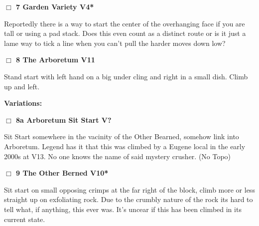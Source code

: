 	\begin{multicols}{2}

\needspace{2em}
\label{rt:Garden Variety}
\colorbox{RoyalBlue!20}{
\parbox{0.95\linewidth}{
\hspace{-1ex}\textbf{$\Box$
7 Garden Variety V4*  
}}}
\begin{adjustwidth}{1.3em}{}			

Reportedly there is a way to start the center of the overhanging face if you are tall or using a pad stack. Does this even count as a distinct route or is it just a lame way to tick a line when you can't pull the harder moves down low?
\end{adjustwidth}




\needspace{2em}
\label{rt:The Arboretum}
\colorbox{red!20}{
\parbox{0.95\linewidth}{
\hspace{-1ex}\textbf{$\Box$
8 The Arboretum V11  
}}}
\begin{adjustwidth}{1.3em}{}			

Stand start with left hand on a big under cling and right in a small dish. Climb up and left.
\end{adjustwidth}


\begin{adjustwidth}{0.5cm}{}				
\needspace{4em}
\textbf{Variations:} \newline

\needspace{2em}
\label{vr:Arboretum Sit Start}
\colorbox{black!20}{
\parbox{0.95\linewidth}{
\hspace{-1ex}\textbf{$\Box$
8a Arboretum Sit Start V?  
}}}
\begin{adjustwidth}{1.3em}{}			

Sit Start somewhere in the vacinity of the Other Bearned, somehow link into Arboretum. Legend has it that this was climbed by a Eugene local in the early 2000s at V13. No one knows the name of said mystery crusher.
  (No Topo)
\end{adjustwidth}



\end{adjustwidth}


\needspace{2em}
\label{rt:The Other Berned}
\colorbox{red!20}{
\parbox{0.95\linewidth}{
\hspace{-1ex}\textbf{$\Box$
9 The Other Berned V10*  
}}}
\begin{adjustwidth}{1.3em}{}			

Sit start on small opposing crimps at the far right of the block, climb more or less straight up on exfoliating rock. Due to the crumbly nature of the rock its hard to tell what, if anything, this ever was. It's uncear if this has been climbed in its current state.
\end{adjustwidth}




	\end{multicols}
